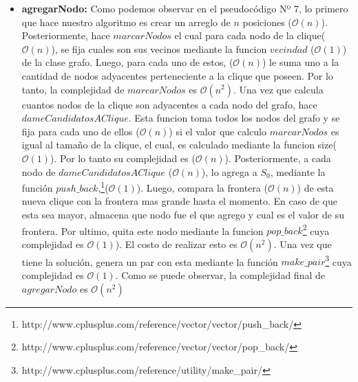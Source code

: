 \begin{itemize}
\item \textbf{agregarNodo:} \newline 
Como podemos observar en el pseudocódigo Nº 7, lo primero que hace nuestro algoritmo es crear un arreglo de $n$ posiciones ($\mathcal{O}(n)$). Posteriormente, hace $marcarNodos$ el cual para cada nodo de la clique($\mathcal{O}(n)$), se fija cuales son sus vecinos mediante la funcion $vecindad$ ($\mathcal{O}(1)$) de la clase grafo. Luego, para cada uno de estos, ($\mathcal{O}(n)$) le suma uno a la cantidad de nodos adyacentes perteneciente a la clique que poseen. Por lo tanto, la complejidad de $marcarNodos$ es $\mathcal{O}(n^{2})$. \newline
Una vez que calcula cuantos nodos de la clique son adyacentes a cada nodo del grafo, hace $dameCandidatosAClique$. Esta funcion toma todos los nodos del grafo y se fija para cada uno de ellos ($\mathcal{O}(n)$) si el valor que calculo $marcarNodos$ es igual al tamaño de la clique, el cual, es calculado mediante la funcion size($\mathcal{O}(1)$). Por lo tanto su complejidad es ($\mathcal{O}(n)$). \newline
Posteriormente, a cada nodo de $dameCandidatosAClique$ ($\mathcal{O}(n)$), lo agrega a $S_{0}$, mediante la función $push\_back$,\footnote{http://www.cplusplus.com/reference/vector/vector/push\_back/}($\mathcal{O}(1)$). Luego, compara la frontera ($\mathcal{O}(n)$) de esta nueva clique con la frontera mas grande hasta el momento. En caso de que esta sea mayor, almacena que nodo fue el que agrego y cual es el valor de su frontera. Por ultimo, quita este nodo mediante la funcion $pop\_back$\footnote{http://www.cplusplus.com/reference/vector/vector/pop\_back/} cuya complejidad es $\mathcal{O}(1)$). El costo de realizar esto es $\mathcal{O}(n^{2})$. \newline
Una vez que tiene la solución, genera un par con esta mediante la función $make\_pair$\footnote{http://www.cplusplus.com/reference/utility/make\_pair/} cuya complejidad es $\mathcal{O}(1)$.
\newline
Como se puede observar, la complejidad final de $agregarNodo$ es $\mathcal{O}(n^{2})$


\end{itemize}
